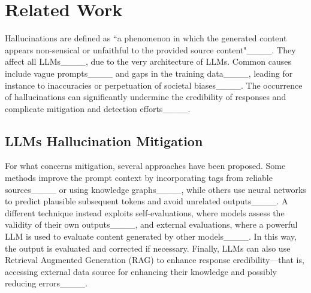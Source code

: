 \section{Related Work}
\label{sec:relworks}
Hallucinations are defined as ``a phenomenon in which the generated content appears non-sensical or unfaithful to the provided source content"____. They affect all LLMs____, due to the very architecture of LLMs. Common causes include vague prompts____ and gaps in the training data____, leading for instance to inaccuracies or perpetuation of societal biases____. The occurrence of hallucinations can significantly undermine the credibility of responses and complicate mitigation and detection efforts____.

\subsection{LLMs Hallucination Mitigation} \label{sub:mitigation} 
For what concerns mitigation, several approaches have been proposed. Some methods improve the prompt context by incorporating tags from reliable sources____ or using knowledge graphs____, while others use neural networks to predict plausible subsequent tokens and avoid unrelated outputs____. A different technique instead exploits self-evaluations, where models assess the validity of their own outputs____, and external evaluations, where a powerful LLM is used to evaluate content generated by other models____. In this way, the output is evaluated and corrected if necessary. Finally, LLMs can also use Retrieval Augmented Generation (RAG) to enhance response credibility---that is, accessing external data source for enhancing their knowledge and possibly reducing errors____.

